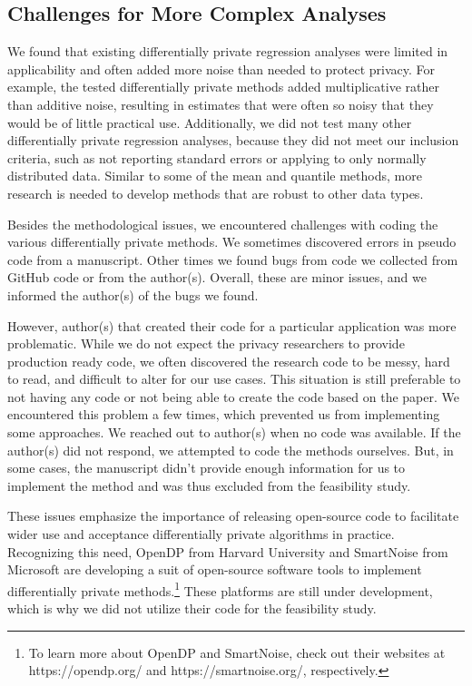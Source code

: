 \subsection{Challenges for More Complex Analyses}
We found that existing differentially private regression analyses were limited in applicability and often added more noise than needed to protect privacy. For example, the tested differentially private methods added multiplicative rather than additive noise, resulting in estimates that were often so noisy that they would be of little practical use. Additionally, we did not test many other differentially private regression analyses, because they did not meet our inclusion criteria, such as not reporting standard errors or applying to only normally distributed data. Similar to some of the mean and quantile methods, more research is needed to develop methods that are robust to other data types.

Besides the methodological issues, we encountered challenges with coding the various differentially private methods. We sometimes discovered errors in pseudo code from a manuscript. Other times we found bugs from code we collected from GitHub code or from the author(s). Overall, these are minor issues, and we informed the author(s) of the bugs we found.

However, author(s) that created their code for a particular application was more problematic. While we do not expect the privacy researchers to provide production ready code, we often discovered the research code to be messy, hard to read, and difficult to alter for our use cases. This situation is still preferable to not having any code or not being able to create the code based on the paper. We encountered this problem a few times, which prevented us from implementing some approaches. We reached out to author(s) when no code was available. If the author(s) did not respond, we attempted to code the methods ourselves. But, in some cases, the manuscript didn't provide enough information for us to implement the method and was thus excluded from the feasibility study.

These issues emphasize the importance of releasing open-source code to facilitate wider use and acceptance differentially private algorithms in practice. Recognizing this need, OpenDP from Harvard University and SmartNoise from Microsoft are developing a suit of open-source software tools to implement differentially private methods.\footnote{To learn more about OpenDP and SmartNoise, check out their websites at https://opendp.org/ and https://smartnoise.org/, respectively.} These platforms are still under development, which is why we did not utilize their code for the feasibility study.

